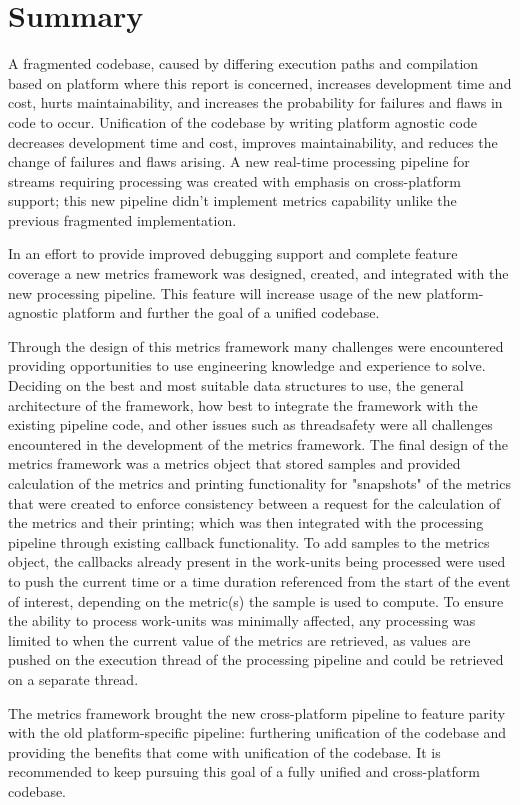 \section{Summary}

\enlargethispage{2\normalbaselineskip}
A fragmented codebase, caused by differing execution paths and compilation based
on platform where this report is concerned, increases development time and cost,
hurts maintainability, and increases the probability for failures and flaws in code to
occur. Unification of the codebase by writing platform agnostic code decreases
development time and cost, improves maintainability, and reduces the change of
failures and flaws arising. A new \gls{real-time} processing \gls{pipeline} for
\glspl{stream} requiring processing was created with emphasis on cross-platform
support; this new \gls{pipeline} didn't implement metrics capability unlike the
previous fragmented implementation.

In an effort to provide improved debugging support and complete feature coverage
a new metrics framework was designed, created, and integrated with the new
processing \gls{pipeline}. This feature will increase usage of the new
platform-agnostic platform and further the goal of a unified codebase.

Through the design of this metrics framework many challenges were encountered
providing opportunities to use engineering knowledge and experience to solve.
Deciding on the best and most suitable data structures to use, the general
architecture of the framework, how best to integrate the framework with the
existing \gls{pipeline} code, and other issues such as \gls{threadsafe}ty were
all challenges encountered in the development of the metrics framework.  The
final design of the metrics framework was a metrics \gls{object} that stored
samples and provided calculation of the metrics and printing functionality for
"snapshots" of the metrics that were created to enforce consistency between a
request for the calculation of the metrics and their printing; which was then
integrated with the processing \gls{pipeline} through existing callback
functionality. To add samples to the metrics object, the callbacks already
present in the \glspl{work-unit} being processed were used to push the current
time or a time duration referenced from the start of the event of interest,
depending on the metric(s) the sample is used to compute.  To ensure the ability
to process \glspl{work-unit} was minimally affected, any processing was limited
to when the current value of the metrics are retrieved, as values are pushed on
the execution \gls{thread} of the processing \gls{pipeline} and could be
retrieved on a separate \gls{thread}.

The metrics framework brought the new cross-platform \gls{pipeline} to
feature parity with the old platform-specific \gls{pipeline}: furthering
unification of the codebase and providing the benefits that come with
unification of the codebase. It is recommended to keep pursuing this goal of a
fully unified and cross-platform codebase.
